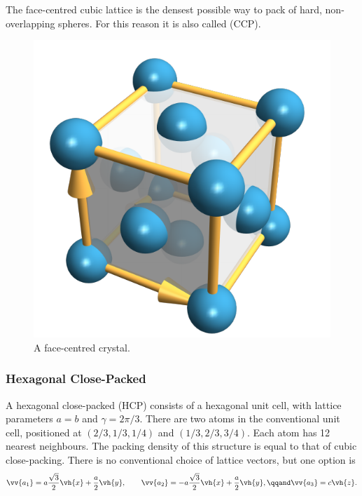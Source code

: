 \documentclass[fleqn]{NotesClass}
\begin{document}
    The face-centred cubic lattice is the densest possible way to pack of hard, non-overlapping spheres.
    For this reason it is also called  (CCP).
    
    \begin{figure}
        \includegraphics{images/fcc-crystal.pdf}
        \caption[FCC crystal.]{A face-centred crystal.}
    \end{figure}
    
    \subsubsection{Hexagonal Close-Packed}
    A hexagonal close-packed (HCP) consists of a hexagonal unit cell, with lattice parameters \(a = b\) and \(\gamma = 2\pi/3\).
    There are two atoms in the conventional unit cell, positioned at \((2/3,1/3,1/4)\) and \((1/3,2/3,3/4)\).
    Each atom has 12 nearest neighbours.
    The packing density of this structure is equal to that of cubic close-packing.
    There is no conventional choice of lattice vectors, but one option is
    \begin{equation}
        \vv{a_1} = a\frac{\sqrt{3}}{2}\vh{x} + \frac{a}{2}\vh{y}, \qquad \vv{a_2} = -a\frac{\sqrt{3}}{2}\vh{x} + \frac{a}{2}\vh{y}, \qqand \vv{a_3} = c\vh{z}.
    \end{equation}
\end{document}
